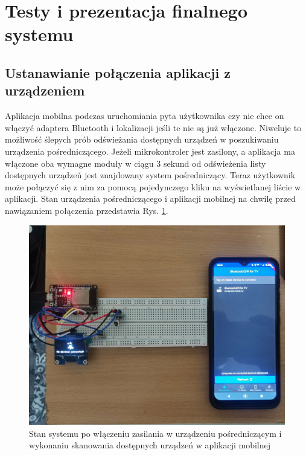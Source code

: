 \documentclass[12pt,twoside,draft]{article}
\begin{document}

\clearpage



\section{Testy i prezentacja finalnego systemu}
\subsection{Ustanawianie połączenia aplikacji z urządzeniem}
Aplikacja mobilna podczas uruchomiania pyta użytkownika czy nie chce on włączyć adaptera Bluetooth i lokalizacji jeśli te nie są już włączone. Niweluje to możliwość ślepych prób odświeżania dostępnych urządzeń w poszukiwaniu urządzenia pośredniczącego. Jeżeli mikrokontroler jest zasilony, a aplikacja ma włączone oba wymagne moduły w ciągu 3 sekund od odświeżenia listy dostępnych urządzeń jest znajdowany system pośredniczący. Teraz użytkownik może połączyć się z nim za pomocą pojedynczego kliku na wyświetlanej liście w aplikacji. Stan urządzenia pośredniczącego i aplikacji mobilnej na chwilę przed nawiązaniem połączenia przedstawia Rys. \ref*{Fig:scanTest}.

\begin{figure}[ht]
   \centering
   \includegraphics[width=14cm]{images/scanTest.jpg}
   \caption{Stan systemu po włączeniu zasilania w urządzeniu pośredniczącym i wykonaniu skanowania dostępnych urządzeń w aplikacji mobilnej}
   \label{Fig:scanTest}
\end{figure}
\end{document}
